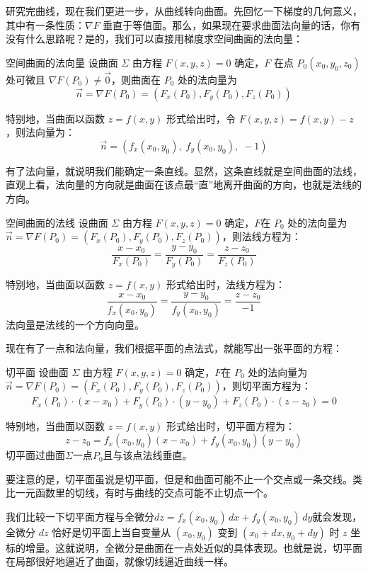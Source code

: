 研究完曲线，现在我们更进一步，从曲线转向曲面。先回忆一下梯度的几何意义，其中有一条性质：$\nabla F$ 垂直于等值面。那么，如果现在要求曲面法向量的话，你有没有什么思路呢？是的，我们可以直接用梯度求空间曲面的法向量：

\begin{theorem}{空间曲面的法向量}{}
设曲面 $\Sigma$ 由方程 $F(x,y,z)=0$ 确定，$F$ 在点 $P_0(x_0,y_0,z_0)$ 处可微且 $\nabla F(P_0)\neq \vec{0}$，则曲面在 $P_0$ 处的法向量为
\[
\vec{n} = \nabla F(P_0) = (F_x(P_0), F_y(P_0), F_z(P_0))
\]

特别地，当曲面以函数 $z=f(x,y)$ 形式给出时，令 $F(x,y,z)=f(x,y)-z$，则法向量为：
\[
\vec{n} = (f_x(x_0,y_0),\; f_y(x_0,y_0),\; -1)
\]
\end{theorem}

有了法向量，就说明我们能确定一条直线。显然，这条直线就是空间曲面的法线，直观上看，法向量的方向就是曲面在该点最“直”地离开曲面的方向，也就是法线的方向。

\begin{theorem}{空间曲面的法线}{}
  设曲面 $\Sigma$ 由方程 $F(x,y,z)=0$ 确定，$F$在 $P_0$ 处的法向量为$\vec{n} = \nabla F(P_0) = (F_x(P_0), F_y(P_0), F_z(P_0))$，则法线方程为：
\[
\frac{x-x_0}{F_x(P_0)} = \frac{y-y_0}{F_y(P_0)} = \frac{z-z_0}{F_z(P_0)}
\]

特别地，当曲面以函数 $z=f(x,y)$ 形式给出时，法线方程为：
\[
\frac{x-x_0}{f_x(x_0,y_0)} = \frac{y-y_0}{f_y(x_0,y_0)} = \frac{z-z_0}{-1}
\]
法向量是法线的一个方向向量。
\end{theorem}

现在有了一点和法向量，我们根据平面的点法式，就能写出一张平面的方程：

\begin{theorem}{切平面}{}
  设曲面 $\Sigma$ 由方程 $F(x,y,z)=0$ 确定，$F$在 $P_0$ 处的法向量为$\vec{n} = \nabla F(P_0) = (F_x(P_0), F_y(P_0), F_z(P_0))$，则切平面方程为：
\[
F_x(P_0) \cdot(x-x_0) + F_y(P_0) \cdot(y-y_0) + F_z(P_0) \cdot(z-z_0) = 0
\]

特别地，当曲面以函数 $z=f(x,y)$ 形式给出时，切平面方程为：
\[
z - z_0 = f_x(x_0,y_0)(x-x_0) + f_y(x_0,y_0)(y-y_0)
\]
切平面过曲面$\Sigma$一点$P_0$且与该点法线垂直。
\end{theorem}

要注意的是，切平面虽说是切平面，但是和曲面可能不止一个交点或一条交线。类比一元函数里的切线，有时与曲线的交点可能不止切点一个。

我们比较一下切平面方程与全微分$dz = f_x(x_0,y_0)\,dx + f_y(x_0,y_0)\,dy$就会发现，全微分 $dz$ 恰好是切平面上当自变量从 $(x_0,y_0)$ 变到 $(x_0+dx,y_0+dy)$ 时 $z$ 坐标的增量。这就说明，全微分是曲面在一点处近似的具体表现。也就是说，切平面在局部很好地逼近了曲面，就像切线逼近曲线一样。


